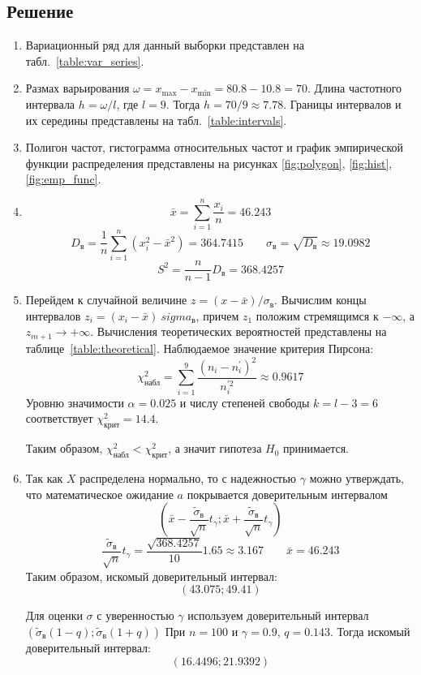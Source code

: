 \documentclass{article}
\theoremstyle{problemstyle}
\begin{document}
\subsection{Решение}
\begin{enumerate}
  \item Вариационный ряд для данный выборки представлен на табл.~\ref{table:var_series}.
  \item Размах варьирования \(\omega = x_{\max} - x_{\min} = 80.8 - 10.8 = 70\).
    Длина частотного интервала \(h = \omega / l\), где \(l = 9\).
    Тогда \(h = 70/9 \approx 7.78\).
    Границы интервалов и их середины представлены на табл.~\ref{table:intervals}.
  \item Полигон частот, гистограмма относительных частот и
    график эмпирической функции распределения представлены на рисунках
    \ref{fig:polygon}, \ref{fig:hist}, \ref{fig:emp_func}.
  \item
    \[ \bar x = \sum_{i = 1}^n \frac{x_i}{n} = 46.243 \]
    \[
      D_\text{в} =
      \frac{1}{n} \sum_{i=1}^n \left( x_i^2 - \bar x^2 \right) =
      364.7415
      \qquad
      \sigma_\text{в} =
      \sqrt{D_\text{в}} \approx
      19.0982
    \]
    \[ S^2 = \frac{n}{n-1} D_\text{в} = 368.4257 \]
  \item Перейдем к случайной величине \(z = (x - \bar x) / \sigma_\text{в} \).
    Вычислим концы интервалов \(z_i = (x_i - \bar x) \ sigma_\text{в} \),
    причем $z_1$ положим стремящимся к $-\infty$, а $z_{m+1} \to +\infty$.
    Вычисления теоретических вероятностей представлены на таблице~\ref{table:theoretical}.
    Наблюдаемое значение критерия Пирсона:
    \[
      \chi_\text{набл}^2 = 
      \sum_{i=1}^9 \frac{(n_i - n^\prime_i)^2}{ n_i^{\prime2}} \approx
      0.9617
    \]
    Уровню значимости \(\alpha = 0.025\) и числу степеней свободы \(k = l - 3 = 6\) 
    соответствует $\chi^2_\text{крит} = 14.4 $.
    
    Таким образом, \(\chi^2_\text{набл} < \chi^2_\text{крит}\), а значит гипотеза
    \(H_0\) принимается.

  \item Так как \(X\) распределена нормально, то с надежностью \(\gamma\)
    можно утверждать, что математическое ожидание \(a\) покрывается
    доверительным интервалом
    \[
      \left(
      \bar x - \frac{\tilde\sigma_\text{в}}{\sqrt{n}} t_\gamma
      ;
      \bar x + \frac{\tilde\sigma_\text{в}}{\sqrt{n}} t_\gamma
      \right)
    \]
    \[
      \frac{\tilde\sigma_\text{в}}{\sqrt{n}} t_\gamma = \frac{\sqrt{368.4257}}{10} 1.65 \approx 3.167
      \qquad
      \bar x = 46.243
    \]
    Таким образом, искомый доверительный интервал:
    \[
      (43.075; 49.41)
    \]

    Для оценки $\sigma$ с уверенностью $\gamma$ используем
    доверительный интервал \( (\tilde\sigma_\text{в} (1 - q); \tilde\sigma_\text{в} (1+q)) \)
    При $n = 100$ и $\gamma = 0.9$, $q = 0.143$. Тогда искомый доверительный интервал:
    \[ (16.4496; 21.9392) \]
\end{enumerate}
\end{document}

